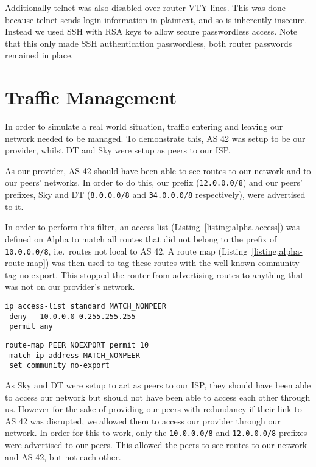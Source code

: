 Additionally telnet was also disabled over router VTY lines. This was done
because telnet sends login information in plaintext, and so is inherently
insecure. Instead we used SSH with RSA keys to allow secure passwordless
access. Note that this only made SSH authentication passwordless, both router
passwords remained in place.

\section{Traffic Management}
In order to simulate a real world situation, traffic entering and leaving our
network needed to be managed. To demonstrate this, AS 42 was setup to
be our provider, whilst DT and Sky were setup as peers to our ISP.

As our provider, AS 42 should have been able to see routes to our network and to
our peers' networks. In order to do this, our prefix (\texttt {12.0.0.0/8}) and
our peers' prefixes, Sky and DT (\texttt{8.0.0.0/8} and
\texttt{34.0.0.0/8} respectively), were advertised to it.

In order to perform this filter, an access list (Listing~\ref{listing:alpha-access})
was defined on Alpha to match
all routes that did not belong to the prefix of \texttt{10.0.0.0/8}, i.e.\
routes not local to AS 42. A route map (Listing~\ref{listing:alpha-route-map}) was then used to tag these routes with
the well known community tag no-export. This stopped the router from
advertising routes to anything that was not on our provider's network.

\begin{lstlisting}[caption={Alpha Access List}, label={listing:alpha-access}]
ip access-list standard MATCH_NONPEER
 deny   10.0.0.0 0.255.255.255
 permit any
\end{lstlisting}
\begin{lstlisting}[caption={Alpha Route Map}, label={listing:alpha-route-map}]
route-map PEER_NOEXPORT permit 10
 match ip address MATCH_NONPEER
 set community no-export
\end{lstlisting}

As Sky and DT were setup to act as peers to our ISP, they should have been able to
access our network but should not have been able to access each other through us. However
for the sake of providing our peers with redundancy if their link to AS 42 was
disrupted, we allowed them to access our provider through our network. In order
for this to work, only the \texttt{10.0.0.0/8} and \texttt{12.0.0.0/8} prefixes
were advertised to our peers. This allowed the peers to see routes to our
network and AS 42, but not each other.

